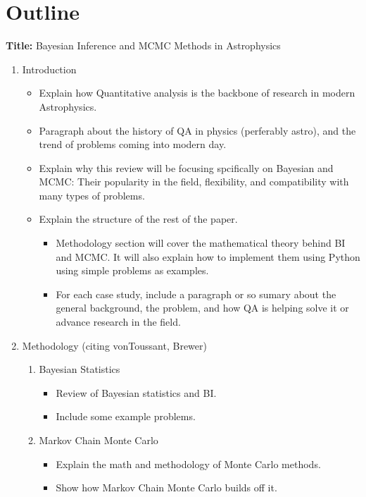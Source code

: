 \documentclass[12pt]{article}
\begin{document}
\section*{Outline}

\textbf{Title:} Bayesian Inference and MCMC Methods in Astrophysics

\begin{enumerate}
  \item Introduction
  \begin{itemize}

    \item Explain how Quantitative analysis is the backbone of research in modern Astrophysics.
    \item Paragraph about the history of QA in physics (perferably astro), and the trend of problems coming into modern day.
    \item Explain why this review will be focusing spcifically on Bayesian and MCMC: Their popularity in the field, flexibility, and compatibility with many types of problems.
    \item Explain the structure of the rest of the paper.
    \begin{itemize}
      \item Methodology section will cover the mathematical theory behind BI and MCMC. It will also explain how to implement them using Python using simple problems as examples.
      \item For each case study, include a paragraph or so sumary about the general background, the problem, and how QA is helping solve it or advance research in the field.
    \end{itemize}
  \end{itemize}
  \item Methodology (citing vonToussant, Brewer)
  \begin{enumerate}
    \item Bayesian Statistics
    \begin{itemize}
      \item Review of Bayesian statistics and BI.
      \item Include some example problems.
    \end{itemize}
    \item Markov Chain Monte Carlo
    \begin{itemize}
      \item Explain the math and methodology of Monte Carlo methods. \item Show how Markov Chain Monte Carlo builds off it.

\end{itemize}
\end{enumerate}
\end{enumerate}
\end{document}
